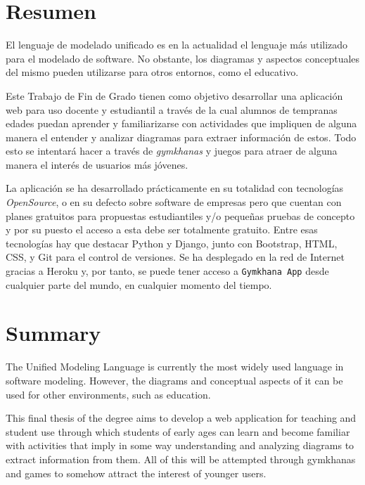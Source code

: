\documentclass[a4paper, 12pt]{book}
\begin{document}
\chapter*{Resumen}

El lenguaje de modelado unificado es en la actualidad el lenguaje más utilizado para el modelado de software. No obstante, los diagramas y aspectos conceptuales del mismo pueden utilizarse para otros entornos, como el educativo.  

Este Trabajo de Fin de Grado tienen como objetivo desarrollar una aplicación web para uso docente y estudiantil a través de la cual alumnos de tempranas edades puedan aprender y familiarizarse con actividades que impliquen de alguna manera el entender y analizar diagramas para extraer información de estos. Todo esto se intentará hacer a través de \emph{gymkhanas} y juegos para atraer de alguna manera el interés de usuarios más jóvenes.

La aplicación se ha desarrollado prácticamente en su totalidad con tecnologías \emph{OpenSource}, o en su defecto sobre software de empresas pero que cuentan con planes gratuitos para propuestas estudiantiles y/o pequeñas pruebas de concepto y por su puesto el acceso a esta debe ser totalmente gratuito. Entre esas tecnologías hay que destacar Python y Django, junto con Bootstrap, HTML, CSS, y Git para el control de versiones. Se ha desplegado en la red de Internet gracias a Heroku y, por tanto, se puede tener acceso a \texttt{Gymkhana App} desde cualquier parte del mundo, en cualquier momento del tiempo.


\chapter*{Summary}
The Unified Modeling Language is currently the most widely used language in software modeling. However, the diagrams and conceptual aspects of it can be used for other environments, such as education.

This final thesis of the degree aims to develop a web application for teaching and student use through which students of early ages can learn and become familiar with activities that imply in some way understanding and analyzing diagrams to extract information from them. All of this will be attempted through gymkhanas and games to somehow attract the interest of younger users.
\end{document}

